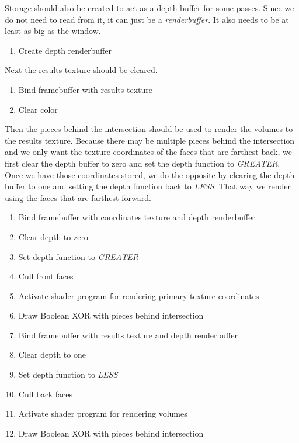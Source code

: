 \documentclass{article}
\begin{document}
Storage should also be created to act as a depth buffer for some passes.  Since
we do not need to read from it, it can just be a \emph{renderbuffer}.  It also
needs to be at least as big as the window.

\begin{enumerate}
  \item Create depth renderbuffer
\end{enumerate}

Next the results texture should be cleared.

\begin{enumerate}
  \item Bind framebuffer with results texture
  \item Clear color
\end{enumerate}

Then the pieces behind the intersection should be used to render the volumes to
the results texture.  Because there may be multiple pieces behind the
intersection and we only want the texture coordinates of the faces that are
farthest back, we first clear the depth buffer to zero and set the depth
function to \emph{GREATER}.  Once we have those coordinates stored, we do the
opposite by clearing the depth buffer to one and setting the depth function back
to \emph{LESS}.  That way we render using the faces that are farthest forward.

\begin{enumerate}
  \item Bind framebuffer with coordinates texture and depth renderbuffer
  \item Clear depth to zero
  \item Set depth function to \emph{GREATER}
  \item Cull front faces
  \item Activate shader program for rendering primary texture coordinates
  \item Draw Boolean XOR with pieces behind intersection
  \item Bind framebuffer with results texture and depth renderbuffer
  \item Clear depth to one
  \item Set depth function to \emph{LESS}
  \item Cull back faces
  \item Activate shader program for rendering volumes
  \item Draw Boolean XOR with pieces behind intersection
\end{enumerate}
\end{document}
